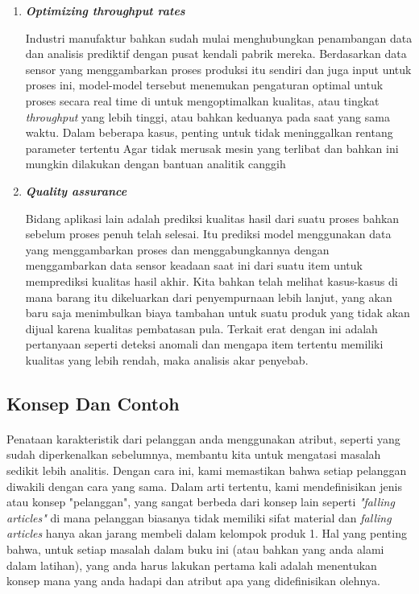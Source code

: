 \begin{enumerate}
\item 	\textit{\textbf{Optimizing throughput rates}}

\par Industri manufaktur bahkan sudah mulai menghubungkan penambangan data dan analisis prediktif dengan pusat kendali pabrik mereka. Berdasarkan data sensor yang menggambarkan proses produksi itu sendiri dan juga input untuk proses ini, model-model tersebut menemukan pengaturan optimal untuk proses secara real time di untuk mengoptimalkan kualitas, atau tingkat\textit{ throughput} yang lebih tinggi, atau bahkan keduanya pada saat yang sama waktu. Dalam beberapa kasus, penting untuk tidak meninggalkan rentang parameter tertentu Agar tidak merusak mesin yang terlibat dan bahkan ini mungkin dilakukan dengan bantuan analitik canggih

\item \textit{\textbf{Quality assurance}}
\par Bidang aplikasi lain adalah prediksi kualitas hasil dari suatu proses bahkan sebelum proses penuh telah selesai. Itu prediksi model menggunakan data yang menggambarkan proses dan menggabungkannya dengan menggambarkan data sensor keadaan saat ini dari suatu item untuk memprediksi kualitas hasil akhir. Kita bahkan telah melihat kasus-kasus di mana barang itu dikeluarkan dari penyempurnaan lebih lanjut, yang akan baru saja menimbulkan biaya tambahan untuk suatu produk yang tidak akan dijual karena kualitas pembatasan pula. Terkait erat dengan ini adalah pertanyaan seperti deteksi anomali dan mengapa item tertentu memiliki kualitas yang lebih rendah, maka analisis akar penyebab.
\end{enumerate}

\subsection{Konsep Dan Contoh}
\paragraph{}Penataan karakteristik dari pelanggan anda menggunakan atribut, seperti yang sudah diperkenalkan sebelumnya, membantu kita untuk mengatasi masalah sedikit lebih analitis. Dengan cara ini, kami memastikan bahwa setiap pelanggan diwakili dengan cara yang sama. Dalam arti tertentu, kami mendefinisikan jenis atau konsep "pelanggan", yang sangat berbeda dari konsep lain seperti \textit{"falling articles"} di mana pelanggan biasanya tidak memiliki sifat material dan \textit{falling articles} hanya akan jarang membeli dalam kelompok produk 1. Hal yang penting bahwa, untuk setiap masalah dalam buku ini (atau bahkan yang anda alami dalam latihan), yang anda harus lakukan pertama kali adalah menentukan konsep mana yang anda hadapi dan atribut apa yang didefinisikan olehnya.

